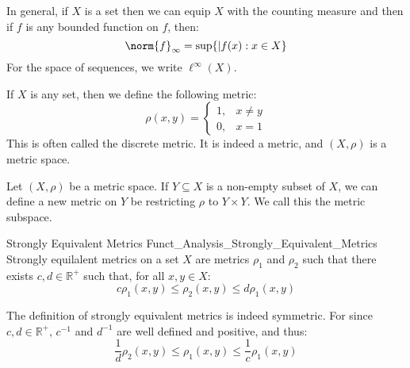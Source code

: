             In general, if $X$ is a set then we can equip $X$
            with the counting measure and then if $f$ is any
            bounded function on $f$, then:
            \begin{equation}
                \norm{f}_{\infty}=\sup\{|f(x):x\in{X}\}
            \end{equation}
            For the space of sequences, we write $\ell^{\infty}(X)$.
            \begin{lexample}
                If $X$ is any set, then we define the following
                metric:
                \begin{equation}
                    \rho(x,y)=
                    \begin{cases}
                        1,&x\ne{y}\\
                        0,&x=1
                    \end{cases}
                \end{equation}
                This is often called the discrete metric. It is
                indeed a metric, and $(X,\rho)$ is a metric space.
            \end{lexample}
            \begin{lexample}
                Let $(X,\rho)$ be a metric space. If $Y\subseteq{X}$
                is a non-empty subset of $X$, we can define a new
                metric on $Y$
                be restricting $\rho$ to $Y\times{Y}$. We call
                this the metric subspace.
            \end{lexample}
            \begin{ldefinition}{Strongly Equivalent Metrics}
                  {Funct_Analysis_Strongly_Equivalent_Metrics}
                Strongly equilalent metrics on a set $X$ are metrics
                $\rho_{1}$ and $\rho_{2}$ such that there
                exists $c,d\in\mathbb{R}^{+}$ such that, for
                all $x,y\in{X}$:
                \begin{equation}
                    c\rho_{1}(x,y)\leq
                        \rho_{2}(x,y)\leq{d}\rho_{1}(x,y)
                \end{equation}
            \end{ldefinition}
            The definition of strongly equivalent metrics is indeed
            symmetric. For since $c,d\in\mathbb{R}^{+}$,
            $c^{-1}$ and $d^{-1}$ are well defined and positive,
            and thus:
            \begin{equation}
                \frac{1}{d}\rho_{2}(x,y)\leq\rho_{1}(x,y)
                \leq\frac{1}{c}\rho_{1}(x,y)
            \end{equation}
